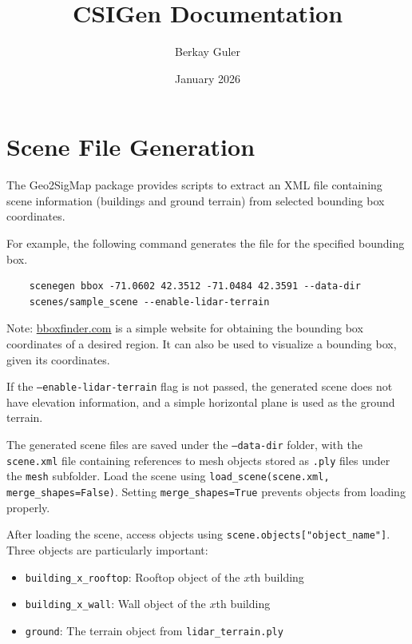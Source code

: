 \documentclass{article}
\title{CSIGen Documentation}
\author{Berkay Guler}
\date{January 2026}
\begin{document}
\maketitle

\clearpage

\section{Scene File Generation}
The Geo2SigMap package provides scripts to extract an XML file containing scene information (buildings and ground terrain) from selected bounding box coordinates.

\flushleft
For example, the following command generates the file for the specified bounding box.

\begin{verbatim}
    scenegen bbox -71.0602 42.3512 -71.0484 42.3591 --data-dir
    scenes/sample_scene --enable-lidar-terrain
\end{verbatim}

Note: \href{https://bboxfinder.com}{bboxfinder.com} is a simple website for obtaining the bounding box coordinates of a desired region. It can also be used to visualize a bounding box, given its coordinates.

If the \texttt{--enable-lidar-terrain} flag is not passed, the generated scene does not have elevation information, and a simple horizontal plane is used as the ground terrain.

The generated scene files are saved under the \texttt{--data-dir} folder, with the \texttt{scene.xml} file containing references to mesh objects stored as \texttt{.ply} files under the \texttt{mesh} subfolder. Load the scene using \texttt{load\_scene(scene.xml, merge\_shapes=False)}. Setting \texttt{merge\_shapes=True} prevents objects from loading properly.

\vspace{1em}

After loading the scene, access objects using \texttt{scene.objects["object\_name"]}. Three objects are particularly important:
\begin{itemize}
  \item \texttt{building\_x\_rooftop}: Rooftop object of the $x$th building
  \item \texttt{building\_x\_wall}: Wall object of the $x$th building
  \item \texttt{ground}: The terrain object from \texttt{lidar\_terrain.ply}
\end{itemize}
\end{document}
